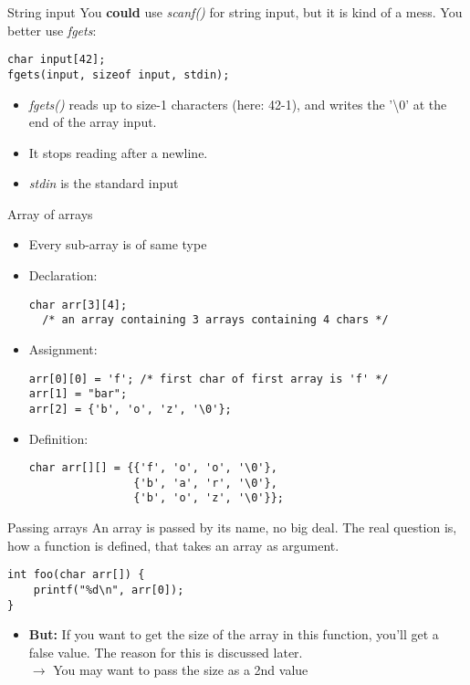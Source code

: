 \begin{frame}[fragile]{String input}
	You \textbf{could} use \textit{scanf()} for string input, but it is kind of a mess. You better use \textit{fgets}:
	\begin{lstlisting}[numbers=none]
char input[42];
fgets(input, sizeof input, stdin);
\end{lstlisting}
	\begin{itemize}
		\item \textit{fgets()} reads up to size-1 characters (here: 42-1), and writes the '\textbackslash0' at the end of the array input.
		\item It stops reading after a newline.
		\item \textit{stdin} is the standard input
	\end{itemize}
\end{frame}
\begin{frame}[fragile]{Array of arrays}
	\begin{itemize}
		\item Every sub-array is of same type
		\item Declaration:
		\begin{lstlisting}[numbers=none]
char arr[3][4];
  /* an array containing 3 arrays containing 4 chars */
\end{lstlisting}
		\item Assignment:
		\begin{lstlisting}[numbers=none]
arr[0][0] = 'f'; /* first char of first array is 'f' */
arr[1] = "bar";
arr[2] = {'b', 'o', 'z', '\0'};
\end{lstlisting}
		\item Definition:
		\begin{lstlisting}[numbers=none]
char arr[][] = {{'f', 'o', 'o', '\0'},
				{'b', 'a', 'r', '\0'},
				{'b', 'o', 'z', '\0'}};
\end{lstlisting}
	\end{itemize}
\end{frame}
\begin{frame}[fragile]{Passing arrays}
	An array is passed by its name, no big deal. The real question is, how a function is defined, that takes an array as argument.
	\begin{lstlisting}[numbers=none]
int foo(char arr[]) {
	printf("%d\n", arr[0]);
}
\end{lstlisting}
	\begin{itemize}
		\item \textbf{But:} If you want to get the size of the array in this function, you'll get a false value. The reason for this is discussed later.\\
		$\rightarrow$ You may want to pass the size as a 2nd value
	\end{itemize}
\end{frame}


